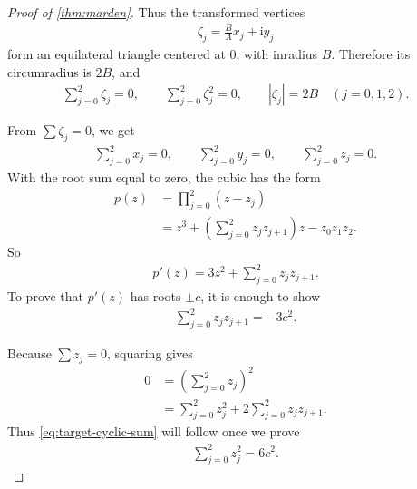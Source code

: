 \documentclass[11pt]{article}
\newcommand{\ii}{\mathrm{i}}
\begin{document}
\begin{proof}[Proof of \cref{thm:marden}]
Thus the transformed vertices
\begin{align}
  \zeta_j=\frac{B}{A}x_j+\ii y_j
\end{align}
form an equilateral triangle centered at \(0\), with inradius \(B\). Therefore its circumradius is \(2B\), and
\begin{align}
  \sum_{j=0}^{2}\zeta_j=0,
  \qquad
  \sum_{j=0}^{2}\zeta_j^2=0,
  \qquad
  |\zeta_j|=2B \quad (j=0,1,2).
  \label{eq:equilateral-relations}
\end{align}

From \(\sum \zeta_j=0\), we get
\begin{align}
  \sum_{j=0}^{2}x_j=0,
  \qquad
  \sum_{j=0}^{2}y_j=0,
  \qquad
  \sum_{j=0}^{2}z_j=0.
  \label{eq:sum-z-zero}
\end{align}
With the root sum equal to zero, the cubic has the form
\begin{align}
  p(z)
    &=\prod_{j=0}^{2}(z-z_j)\\
    &=z^3+\left(\sum_{j=0}^{2}z_jz_{j+1}\right)z-z_0z_1z_2.
  \label{eq:centered-cubic-proof}
\end{align}
So
\begin{align}
  p'(z)=3z^2+\sum_{j=0}^{2}z_jz_{j+1}.
  \label{eq:derivative-proof-form}
\end{align}
To prove that \(p'(z)\) has roots \(\pm c\), it is enough to show
\begin{align}
  \sum_{j=0}^{2}z_jz_{j+1}=-3c^2.
  \label{eq:target-cyclic-sum}
\end{align}

Because \(\sum z_j=0\), squaring gives
\begin{align}
  0
    &=\left(\sum_{j=0}^{2}z_j\right)^2\\
    &=\sum_{j=0}^{2}z_j^2
      +2\sum_{j=0}^{2}z_jz_{j+1}.
  \label{eq:square-sum-zero}
\end{align}
Thus \cref{eq:target-cyclic-sum} will follow once we prove
\begin{align}
  \sum_{j=0}^{2}z_j^2=6c^2.
  \label{eq:sum-squares-target}
\end{align}


\end{proof}
\end{document}
